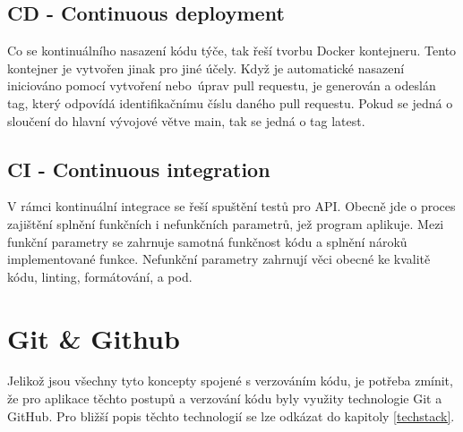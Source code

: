 \subsection{CD - Continuous deployment}
Co se kontinuálního nasazení kódu týče, tak řeší tvorbu Docker kontejneru. Tento kontejner je vytvořen jinak pro jiné účely. Když je automatické nasazení iniciováno pomocí vytvoření nebo~úprav pull requestu, je generován a odeslán tag, který odpovídá identifikačnímu číslu daného pull requestu. Pokud se jedná o sloučení do hlavní vývojové větve main, tak se jedná o tag latest.

\subsection{CI - Continuous integration}
V rámci kontinuální integrace se řeší spuštění testů pro API. Obecně jde o proces zajištění splnění funkčních i nefunkčních parametrů, jež program aplikuje. Mezi funkční parametry se zahrnuje samotná funkčnost kódu a splnění nároků implementované funkce. Nefunkční parametry zahrnují věci obecné ke kvalitě kódu, linting, formátování, a pod.

\section{Git \& Github}
Jelikož jsou všechny tyto koncepty spojené s verzováním kódu, je potřeba zmínit, že pro aplikace těchto postupů a verzování kódu byly využity technologie Git a GitHub. Pro bližší popis těchto technologií se lze odkázat do kapitoly \ref{techstack}.
